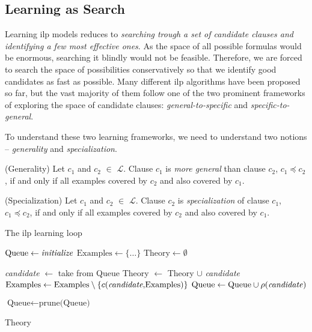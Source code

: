 \subsection{Learning as Search}

Learning \gls{ilp} models reduces to \textit{searching trough a set of candidate clauses and identifying a few most effective ones}.
As the space of all possible formulas would be enormous, searching it blindly would not be feasible.
Therefore, we are forced to search the space of possibilities conservatively so that we identify good candidates as fast as possible.
Many different \gls{ilp} algorithms have been proposed so far, but the vast majority of them follow one of the two prominent frameworks of exploring the space of candidate clauses: \textit{general-to-specific} and \textit{specific-to-general}.



To understand these two learning frameworks, we need to understand two notions -- \textit{generality} and \textit{specialization}.

\begin{definition}{(Generality)}
Let $c_1$ and $c_2$ $\in$ $\mathcal{L}$.
Clause $c_1$ is \textit{more general} than clause $c_2$, $c_1 \preceq c_2$, if and only if all examples covered by $c_2$ and also covered by $c_1$.
\end{definition}



\begin{definition}{(Specialization)}
Let $c_1$ and $c_2$ $\in$ $\mathcal{L}$.
Clause $c_2$ is \textit{specialization} of clause $c_1$, $c_1 \preceq c_2$, if and only if all examples covered by $c_2$ and also covered by $c_1$.
\end{definition}




\begin{algorithm}

	\caption{The \gls{ilp} learning loop}
	\begin{algorithmic}
		\STATE $\text{Queue} \leftarrow \text{\textit{initialize}}$
		\STATE $\text{Examples} \leftarrow \{\text{\ldots}\}$
		\STATE $\text{Theory} \leftarrow \emptyset$

			\STATE \textit{candidate} $\leftarrow$ take from Queue
				\STATE Theory $\leftarrow$ Theory $\cup$ \textit{candidate}
				\STATE $\text{Examples} \leftarrow \text{Examples} \setminus \{c(\text{\textit{candidate},Examples})\}$
			\ELSE
				\STATE $\text{Queue} \leftarrow \text{Queue} \cup \rho(\text{\textit{candidate}})$
			\ENDIF

			\STATE $\text{Queue} \leftarrow \text{prune(Queue)}$

		\ENDWHILE
		\RETURN Theory

	\end{algorithmic}
	\label{alg:ilploop}
\end{algorithm}


